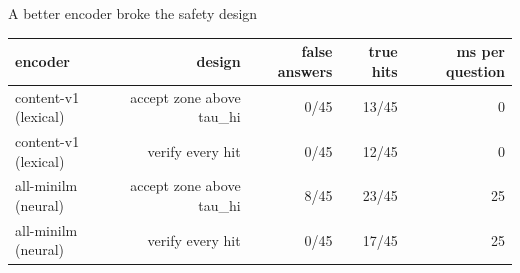 \documentclass[aspectratio=169]{beamer}
\begin{document}
\begin{frame}{A better encoder broke the safety design}
  \begin{center}
  \begin{tabular}{lrrrr}
    \toprule
    \textbf{encoder} & \textbf{design} & \textbf{false answers} & \textbf{true hits} & \textbf{ms per question} \\
    \midrule
      content-v1 (lexical) & accept zone above tau\_hi & 0/45 & 13/45 & 0 \\
      content-v1 (lexical) & verify every hit & 0/45 & 12/45 & 0 \\
      all-minilm (neural) & accept zone above tau\_hi & 8/45 & 23/45 & 25 \\
      all-minilm (neural) & verify every hit & 0/45 & 17/45 & 25 \\
    \bottomrule
  \end{tabular}
  \end{center}
\end{frame}
\end{document}
